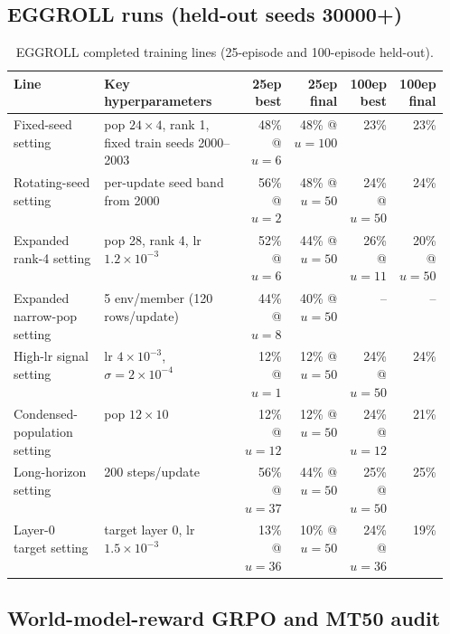 \subsection{EGGROLL runs (held-out seeds 30000+)}
\label{sec:supp-eggroll}

\begin{table}[H]
\centering
\caption{EGGROLL completed training lines (25-episode and 100-episode held-out).}
\label{tab:supp-eggroll}
\small
\setlength{\tabcolsep}{3pt}
\begin{tabular}{@{}p{0.22\linewidth}p{0.34\linewidth}rrrr@{}}
\toprule
Line & Key hyperparameters & 25ep best & 25ep final & 100ep best & 100ep final \\
\midrule
Fixed-seed setting & pop $24{\times}4$, rank 1, fixed train seeds 2000--2003 & 48\% @ $u{=}6$ & 48\% @ $u{=}100$ & 23\% & 23\% \\
Rotating-seed setting & per-update seed band from 2000 & 56\% @ $u{=}2$ & 48\% @ $u{=}50$ & 24\% @ $u{=}50$ & 24\% \\
Expanded rank-4 setting & pop 28, rank 4, lr $1.2{\times}10^{-3}$ & 52\% @ $u{=}6$ & 44\% @ $u{=}50$ & 26\% @ $u{=}11$ & 20\% @ $u{=}50$ \\
Expanded narrow-pop setting & 5 env/member (120 rows/update) & 44\% @ $u{=}8$ & 40\% @ $u{=}50$ & -- & -- \\
High-lr signal setting & lr $4{\times}10^{-3}$, $\sigma{=}2{\times}10^{-4}$ & 12\% @ $u{=}1$ & 12\% @ $u{=}50$ & 24\% @ $u{=}50$ & 24\% \\
Condensed-population setting & pop $12{\times}10$ & 12\% @ $u{=}12$ & 12\% @ $u{=}50$ & 24\% @ $u{=}12$ & 21\% \\
Long-horizon setting & 200 steps/update & 56\% @ $u{=}37$ & 44\% @ $u{=}50$ & 25\% @ $u{=}50$ & 25\% \\
Layer-0 target setting & target layer 0, lr $1.5{\times}10^{-3}$ & 13\% @ $u{=}36$ & 10\% @ $u{=}50$ & 24\% @ $u{=}36$ & 19\% \\
\bottomrule
\end{tabular}
\end{table}

\subsection{World-model-reward GRPO and MT50 audit}
\label{sec:supp-wm-audit}


